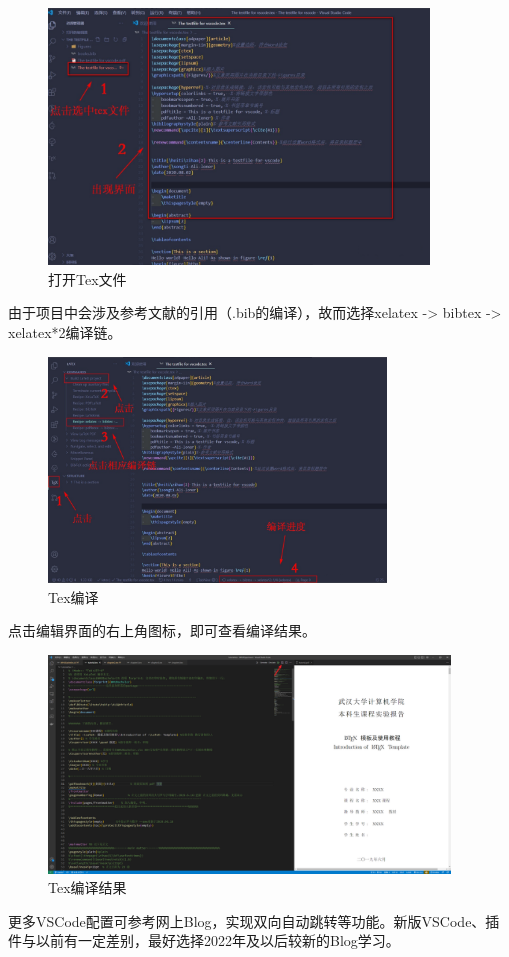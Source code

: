 \begin{figure}[H]
  \centering
  \includegraphics[width=0.9\textwidth]{figures/chapter2/vscode-openfile.png}
  \caption{打开Tex文件}
  \label{fig:2-vscode-open-file}
\end{figure}

由于项目中会涉及参考文献的引用（.bib的编译），故而选择xelatex -> bibtex -> xelatex*2编译链。

\begin{figure}[htb]
  \centering
  \includegraphics[width=0.8\textwidth]{figures/chapter2/vscode-compile.png}
  \caption{Tex编译}
  \label{fig:2-vscode-tex-compile}
\end{figure}

点击编辑界面的右上角图标，即可查看编译结果。

\begin{figure}[H]
  \centering
  \includegraphics[width=0.95\textwidth]{figures/chapter2/vscode-edit.png}
  \caption{Tex编译结果}
  \label{fig:2-vscode-edit}
\end{figure}

更多VSCode配置可参考网上Blog，实现双向自动跳转等功能。新版VSCode、插件与以前有一定差别，最好选择2022年及以后较新的Blog学习。